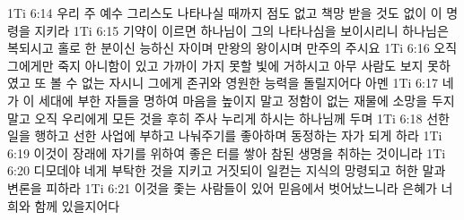 1Ti 6:14  우리 주 예수 그리스도 나타나실 때까지 점도 없고 책망 받을 것도 없이 이 명령을 지키라
1Ti 6:15  기약이 이르면 하나님이 그의 나타나심을 보이시리니 하나님은 복되시고 홀로 한 분이신 능하신 자이며 만왕의 왕이시며 만주의 주시요
1Ti 6:16  오직 그에게만 죽지 아니함이 있고 가까이 가지 못할 빛에 거하시고 아무 사람도 보지 못하였고 또 볼 수 없는 자시니 그에게 존귀와 영원한 능력을 돌릴지어다 아멘
1Ti 6:17  네가 이 세대에 부한 자들을 명하여 마음을 높이지 말고 정함이 없는 재물에 소망을 두지 말고 오직 우리에게 모든 것을 후히 주사 누리게 하시는 하나님께 두며
1Ti 6:18  선한 일을 행하고 선한 사업에 부하고 나눠주기를 좋아하며 동정하는 자가 되게 하라
1Ti 6:19  이것이 장래에 자기를 위하여 좋은 터를 쌓아 참된 생명을 취하는 것이니라
1Ti 6:20  디모데야 네게 부탁한 것을 지키고 거짓되이 일컫는 지식의 망령되고 허한 말과 변론을 피하라
1Ti 6:21  이것을 좇는 사람들이 있어 믿음에서 벗어났느니라 은혜가 너희와 함께 있을지어다


